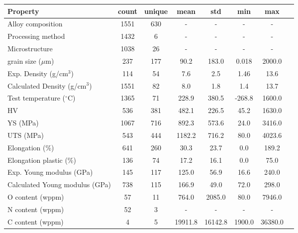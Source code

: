 \begin{tabular}{lccccccc}
\toprule
Property & count & unique & mean & std & min & max \\
\midrule
Alloy composition & 1551 & 630 & - & - & - & - \\
Processing method & 1432 & 6 & - & - & - & - \\
Microstructure & 1038 & 26 & - & - & - & - \\
grain size ($\mu$m) & 237 & 177 & 90.2 & 183.0 & 0.018 & 2000.0 \\
Exp. Density (g/cm$^3$) & 114 & 54 & 7.6 & 2.5 & 1.46 & 13.6 \\
Calculated Density (g/cm$^3$) & 1551 & 82 & 8.0 & 1.8 & 1.4 & 13.7 \\
Test temperature ($^\circ$C) & 1365 & 71 & 228.9 & 380.5 & -268.8 & 1600.0 \\
HV & 536 & 381 & 482.1 & 226.5 & 45.2 & 1630.0 \\
YS (MPa) & 1067 & 716 & 892.3 & 573.6 & 24.0 & 3416.0 \\
UTS (MPa) & 543 & 444 & 1182.2 & 716.2 & 80.0 & 4023.6 \\
Elongation (\%) & 641 & 260 & 30.3 & 23.7 & 0.0 & 189.2 \\
Elongation plastic (\%) & 136 & 74 & 17.2 & 16.1 & 0.0 & 75.0 \\
Exp. Young modulus (GPa) & 145 & 117 & 125.0 & 56.9 & 16.6 & 240.0 \\
Calculated Young modulus (GPa) & 738 & 115 & 166.9 & 49.0 & 72.0 & 298.0 \\
O content (wppm) & 57 & 11 & 764.0 & 2085.0 & 80.0 & 7946.0 \\
N content (wppm) & 52 & 3 & - & - & - & - \\
C content (wppm) & 4 & 5 & 19911.8 & 16142.8 & 1900.0 & 36380.0 \\
\bottomrule
\end{tabular}

